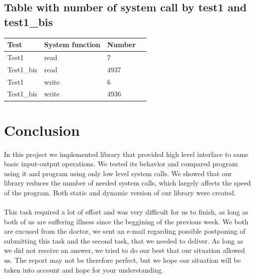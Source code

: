 \documentclass[a4paper,10pt]{article}
\begin{document}
 \subsection{Table with number of system call by test1 and test1\_bis}
\begin{tabular}{|R{2cm}|C{2cm}|L{2cm}|L{2cm}|}
\hline {}Test & System function & Number\\
\hline  Test1 & read & 7 \\
\hline  Test1\_bis  & read & 4937 \\
\hline  Test1 & write & 6 \\
\hline  Test1\_bis  & write & 4936 \\
 \hline 
 \end{tabular}

\newpage


\section{Conclusion}
\paragraph{}
In this project we implemented library that provided high level interface to same basic input-output operations. We tested its behavior and compared program using it and program using only low level system calls. We showed that our library reduces the number of needed system calls, which largely affects the speed of the program. Both static and dynamic version of our library were created. 
\paragraph{} 
This task required a lot of effort and was very difficult for us to finish, as long as both of us are suffering illness since the beggining of the previous week. We both are excused from the doctor, we sent an e-mail regarding possible postponing of submitting this task and the second task, that we needed to deliver. As long as we did not receive an answer, we tried to do our best that our situation allowed us. The report may not be therefore perfect, but we hope our situation will be taken into account and hope for your understanding.
\end{document}

